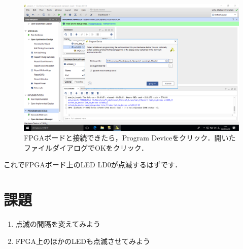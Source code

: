 \documentclass[a4paper,dvipdfmx]{jsarticle}
\begin{document}
 \begin{figure}[H]
  \begin{center}
   \includegraphics[width=.8\textwidth]{chapter03_figures/VirtualBox_Windows10_19_03_2018_00_51_49.png}
  \end{center}
  \caption{FPGAボードと接続できたら，Program Deviceをクリック．開いたファイルダイアログでOKをクリック．}
 \end{figure}

これでFPGAボード上のLED LD0が点滅するはずです．

\section{課題}
\begin{enumerate}
 \item 点滅の間隔を変えてみよう
 \item FPGA上のほかのLEDも点滅させてみよう
\end{enumerate}
\end{document}
